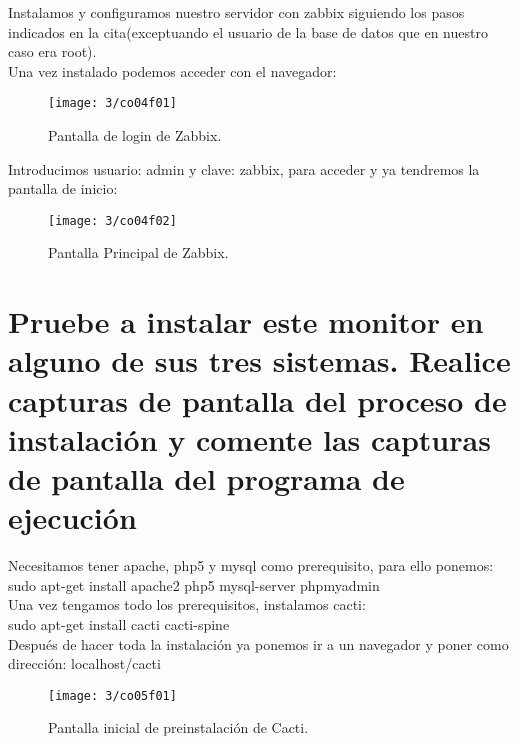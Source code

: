Instalamos y configuramos nuestro servidor con zabbix siguiendo los pasos indicados en la cita(exceptuando el usuario de la base de datos que en nuestro caso era root).\\
Una vez instalado podemos acceder con el navegador:

\begin{figure}[H]
	\centering
	\texttt{[image: 3/co04f01]}
	\caption{Pantalla de login de Zabbix.}
	\label{fig:f20}
\end{figure}

Introducimos usuario: admin y clave: zabbix, para acceder y ya tendremos la pantalla de inicio:\\
\begin{figure}[H]
	\centering
	\texttt{[image: 3/co04f02]}
	\caption{Pantalla Principal de Zabbix.}
	\label{fig:f21}
\end{figure}




\section{Pruebe a instalar este monitor en alguno de sus tres sistemas. Realice capturas de pantalla del proceso de instalación y comente las capturas de pantalla 	del programa de ejecución}

Necesitamos tener apache, php5 y mysql como prerequisito, para ello ponemos:\\

sudo apt-get install apache2 php5 mysql-server phpmyadmin\\

Una vez tengamos todo los prerequisitos, instalamos cacti:\\

sudo apt-get install cacti cacti-spine\\

Después de hacer toda la instalación ya ponemos ir a un navegador y poner como dirección: localhost/cacti

\begin{figure}[H]
	\centering
	\texttt{[image: 3/co05f01]}
	\caption{Pantalla inicial de preinstalación de Cacti.}
	\label{fig:f22}
\end{figure}

